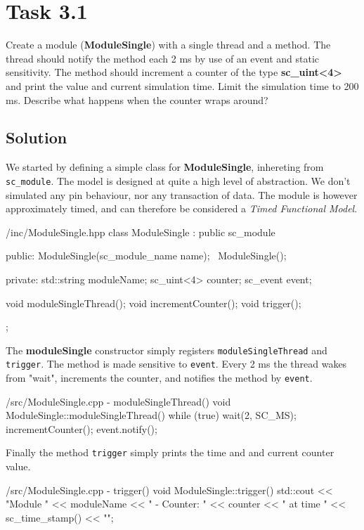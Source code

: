 \documentclass[../main.tex]{subfiles}
\begin{document}
\section{Task 3.1}

Create a module (\textbf{ModuleSingle}) with a single thread and a method. The thread should notify the method each 2 ms by use of an event and static sensitivity. The method should increment a counter of the type \textbf{sc\_uint<4>} and print the value and current simulation time. Limit the simulation time to 200 ms. Describe what happens when the counter wraps around?

\subsection*{Solution}

We started by defining a simple class for \textbf{ModuleSingle}, inhereting from \texttt{sc\_module}.  The model is designed at quite a high level of abstraction. We don't simulated any pin behaviour, nor any transaction of data. The module is however approximately timed, and can therefore be considered a \textit{Timed Functional Model}.

\begin{myminted}{/inc/ModuleSingle.hpp}
class ModuleSingle : public sc_module {
public:
    ModuleSingle(sc_module_name name);
    ~ModuleSingle();

private:
    std::string moduleName;
    sc_uint<4> counter;
    sc_event event;

    void moduleSingleThread();
    void incrementCounter();
    void trigger();
};
\end{myminted}

The \textbf{moduleSingle} constructor simply registers \texttt{moduleSingleThread} and \texttt{trigger}. The method is made sensitive to \texttt{event}. Every 2 ms the thread wakes from "wait", increments the counter, and notifies the method by \texttt{event}.

\begin{myminted}{/src/ModuleSingle.cpp - moduleSingleThread()}
void ModuleSingle::moduleSingleThread() {
    while (true) {
        wait(2, SC_MS); 
        incrementCounter();
        event.notify();
    }
}
\end{myminted}

\newpage

Finally the method \texttt{trigger} simply prints the time and and current counter value.

\begin{myminted}{/src/ModuleSingle.cpp - trigger()}
void ModuleSingle::trigger() {
    std::cout << "Module " << moduleName << " - Counter: " << counter
                << " at time " << sc_time_stamp() << "\n";
}
\end{myminted}
\end{document}
